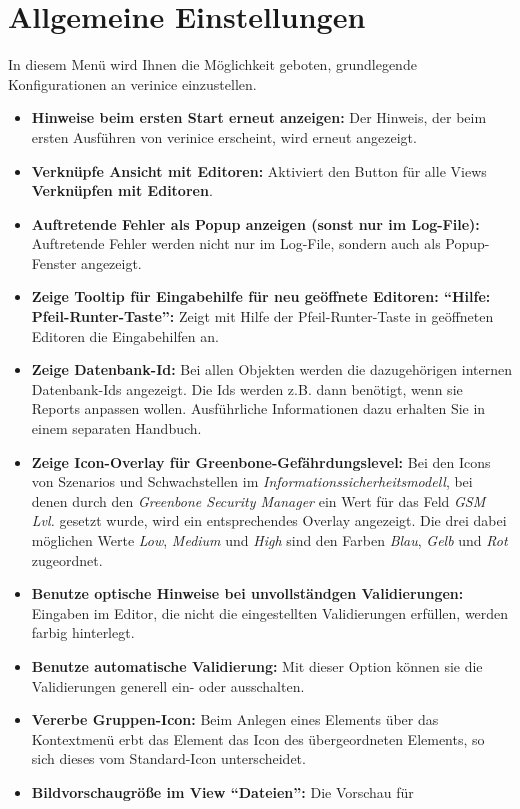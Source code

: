 \documentclass[a4paper,10pt]{book}
\begin{document}
\section{Allgemeine Einstellungen}
In diesem Menü wird Ihnen die Möglichkeit geboten, grundlegende
Konfigurationen an verinice einzustellen.
\begin{itemize}
\item \textbf{Hinweise beim ersten Start erneut anzeigen:} Der
  Hinweis, der beim ersten Ausführen von verinice erscheint, wird
  erneut angezeigt.
\item \textbf{Verknüpfe Ansicht mit Editoren:} Aktiviert den Button
  für alle Views \textbf{Verknüpfen mit Editoren}.
\item \textbf{Auftretende Fehler als Popup anzeigen (sonst nur im
    Log-File):} Auftretende Fehler werden nicht nur im Log-File,
  sondern auch als Popup-Fenster angezeigt.
\item \textbf{Zeige Tooltip für Eingabehilfe für neu geöffnete
    Editoren: ``Hilfe: Pfeil-Runter-Taste'':} Zeigt mit Hilfe der
  Pfeil-Runter-Taste in geöffneten Editoren die Eingabehilfen an.
\item \textbf{Zeige Datenbank-Id:} Bei allen Objekten werden die
  dazugehörigen internen Datenbank-Ids angezeigt. Die Ids werden
  z.B. dann benötigt, wenn sie Reports anpassen wollen. Ausführliche
  Informationen dazu erhalten Sie in einem separaten Handbuch.
\item \textbf{Zeige Icon-Overlay für Greenbone-Gefährdungslevel:} Bei
  den Icons von Szenarios und Schwachstellen im {\em
    Informationssicherheitsmodell}, bei denen durch den {\em Greenbone
    Security Manager} ein Wert für das Feld {\em GSM Lvl.} gesetzt
  wurde, wird ein entsprechendes Overlay angezeigt. Die drei dabei
  möglichen Werte {\em Low}, {\em Medium} und {\em High} sind den
  Farben {\em Blau}, {\em Gelb} und {\em Rot} zugeordnet.
\item \textbf{Benutze optische Hinweise bei unvollständgen
    Validierungen:} Eingaben im Editor, die nicht die eingestellten
  Validierungen erfüllen, werden farbig hinterlegt.
\item \textbf{Benutze automatische Validierung:} Mit dieser Option
  können sie die Validierungen generell ein- oder ausschalten.
\item \textbf{Vererbe Gruppen-Icon:} Beim Anlegen eines Elements über
  das Kontextmenü erbt das Element das Icon des übergeordneten
  Elements, so sich dieses vom Standard-Icon unterscheidet.
\item \textbf{Bildvorschaugröße im View ``Dateien'':} Die Vorschau für

\end{itemize}
\end{document}
